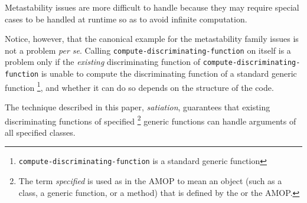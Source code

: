 Metastability issues are more difficult to handle because they may
require special cases to be handled at runtime so as to avoid infinite
computation.  

Notice, however, that the canonical example for the
metastability family issues is not a problem \emph{per se}.  Calling
\texttt{compute-discriminating-function} on itself is a problem only
if the \emph{existing} discriminating function of
\texttt{compute-discriminating-function} is unable to compute the
discriminating function of a standard generic function%
\footnote{\texttt{compute-discriminating-function} is a standard
  generic function}, and whether it can do so depends on the structure
of the code.

The technique described in this paper, \emph{satiation}, guarantees
that existing discriminating functions of specified%
\footnote{The term \emph{specified} is used as in the AMOP to mean
  an object (such as a class, a generic function, or a method) that is
  defined by the \hs{} or the AMOP.}
generic functions can handle arguments of all specified classes.
